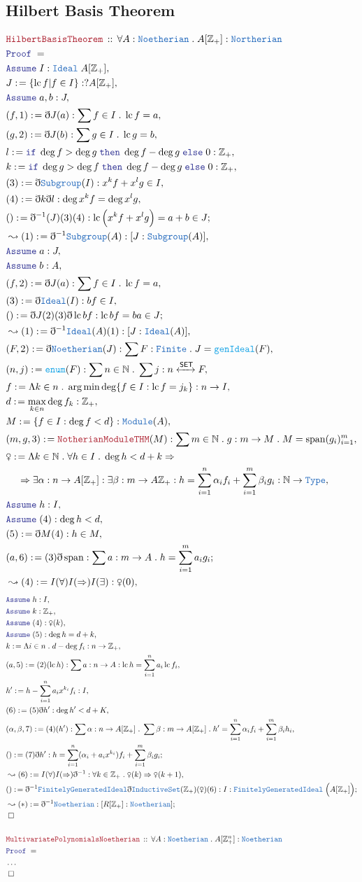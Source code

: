 \documentclass[12pt]{scrartcl}
\newcommand{\TYPE}[1]{\textcolor{NavyBlue}{\mathtt{#1}}}
\newcommand{\FUNC}[1]{\textcolor{Cerulean}{\mathtt{#1}}}
\newcommand{\LOGIC}[1]{\textcolor{Blue}{\mathtt{#1}}}
\newcommand{\THM}[1]{\textcolor{Maroon}{\mathtt{#1}}}
\renewcommand{\.}{\; . \;}
\newcommand{\de}{: \kern 0.1pc =}
\newcommand{\If}{\LOGIC{if} \;}
\newcommand{\Then}{ \; \LOGIC{then} \;}
\newcommand{\Else}{\; \LOGIC{else} \;}
\newcommand{\Theorem}[2]{& \THM{#1} \, :: \, #2 \\ & \Proof = \\ }
\newcommand{\NewLine}{\\ & \kern 1pc}
\newcommand{\Page}[1]{ \begin{align*} #1 \end{align*}   }
\newcommand{ \bd }{ \ByDef }
\newcommand{\NoProof}{ & \ldots \\ \EndProof}
\newcommand{\Type}{\TYPE{Type}}
\newcommand{\Int}{\mathbb{Z} }
\newcommand{\Nat}{\mathbb{N} }
\newcommand{\Say}[3]{& #1 \de #2 : #3, \\}
\newcommand{\Conclude}[3]{& #1 \de #2 : #3; \\}
\newcommand{\Derive}[3]{& \leadsto #1 \de #2 : #3, \\}
\newcommand{\DeriveConclude}[3]{& \leadsto #1 \de #2 : #3 ; \\}
\newcommand{\Assume}[2]{& \LOGIC{Assume} \; #1 : #2, \\}
\newcommand{\QED}{\; \square}
\newcommand{\EndProof}{& \QED \\}
\newcommand{\ByDef}{\eth}
\newcommand{\Proof}{\LOGIC{Proof} \; }
\newcommand{\ToIso}[1]{\xleftrightarrow{#1}}
\newcommand{\SET}{\mathsf{SET}}
\DeclareMathOperator{\Span}{span}
\newcommand{\Ideal}{\TYPE{Ideal}}
\newcommand{\FGI}{\TYPE{FinitelyGeneratedIdeal}}
\DeclareMathOperator{\lc}{lc}
\begin{document}
\subsection{Hilbert Basis Theorem}
\Page{
	\Theorem{HilbertBasisTheorem}{\forall A : \TYPE{Noetherian} \. A[\Int_+] : \TYPE{Northerian}}
	\Assume{I}{\Ideal\; A[\Int_+]}
	\Say{J}{ \{  \lc f | f \in I  \}  }{ ?A[\Int_+]}
	\Assume{a,b}{J}
	\Say{(f,1)}{\bd J(a)}{  \sum f \in I \. \lc f = a   }
	\Say{(g,2)}{\bd J(b)}{  \sum g \in I \. \lc g = b  }
	\Say{l}{ \If \deg f > \deg g \Then \deg f - \deg g  \Else 0}{\Int_+}
	\Say{k}{\If \deg g > \deg f \Then \deg f - \deg g \Else 0}{\Int_+}
	\Say{(3)}{\bd \TYPE{Subgroup}(I)}{x^k f + x^l g \in I  }
	\Say{(4)}{ \bd k \bd l  }{ \deg  x^k f = \deg x^l g   }
	\Conclude{()}{\bd^{-1}(J)(3)(4)}{  \lc\Big( x^k f + x^l g \Big) = a + b \in J    }
	\Derive{(1)}{\bd^{-1}\TYPE{Subgroup}(A)}{[J : \TYPE{Subgroup}(A)]}
	\Assume{a}{J}
	\Assume{b}{A}
	\Say{(f,2)}{\bd J(a)}{\sum f \in I \. \lc f = a}
	\Say{(3)}{\bd \TYPE{Ideal}(I)}{bf \in I}
	\Conclude{()}{ \bd J(2)(3)\bd \lc bf}{\lc bf = ba \in J}
	\Derive{(1)}{ \bd^{-1}\TYPE{Ideal}(A)(1)  }{[J : \TYPE{Ideal}(A)] }
	\Say{(F,2)}{\bd \TYPE{Noetherian}(J)}{\sum F : \TYPE{Finite} \. J = \FUNC{genIdeal}(F)}
	\Say{(n,j)}{\FUNC{enum}(F)}{ \sum n \in \Nat \. \sum j : n \ToIso{\SET} F }
	\Say{f}{ \Lambda k \in n \. \arg \min \deg \{  f \in I : \lc f = j_k \}  }{ n \to I  }
	\Say{d}{ \max_{k \in n} \deg f_k  }{ \Int_+ }
	\Say{M}{ \{ f \in I :  \deg f < d   \}  }{\TYPE{Module}(A)}
	\Say{(m,g,3)}{ \THM{NotherianModuleTHM}(M)  }{ \sum m \in \Nat \. g : m \to M \. M = \Span(g_i)^m_{i=1}  }
	\Say{\venus}{\Lambda k \in \Nat \. \forall h \in I \. \deg h < d + k \Rightarrow \NewLine \Rightarrow \exists \alpha : n \to A[\Int_+] : \exists \beta : m \to A{\Int_+} : h = \sum^n_{i=1} \alpha_i f_i + \sum^m_{i=1} \beta_i g_i   }
	{  \Nat \to \Type   }
	\Assume{h}{I}
	\Assume{(4)}{\deg h < d}
	\Say{(5)}{\bd M(4)}{ h \in M  }
	\Conclude{(a,6)}{(3)\bd \Span }{ \sum a : m \to A \. h = \sum^m_{i=1} a_ig_i }
	\Derive{(4)}{I(\forall)I(\Rightarrow)I(\exists)}{ \venus(0)}
}\Page{
	\Assume{h}{I}
	\Assume{k}{\Int_+}
	\Assume{(4)}{ \venus(k)  }
	\Assume{(5)}{\deg h = d + k}
	\Say{k}{\Lambda i \in n\. d - \deg f_i }{n \to \Int_+}
	\Say{(a,5)}{(2)(\lc h)}{\sum a : n \to A : \lc h = \sum^n_{i=1} a_i\lc f_i}
	\Say{h'}{ h - \sum^n_{i=1} a_i x^{k_i} f_i }{I}
	\Say{(6)}{(5)\bd h'}{\deg h' < d + K}
	\Say{(\alpha,\beta,7)}{(4)(h')}{ \sum \alpha : n \to A[\Int_+] \. \sum \beta : m \to A[\Int_+] \. h' = \sum_{i=1}^n \alpha_i f_i + \sum^m_{i=1} \beta_i h_i}
	\Conclude{()}{(7) \bd h'}{h = \sum^n_{i=1}(\alpha_i +  a_ix^{k_i})f_i + \sum^m_{i=1} \beta_i g_i }
	\Derive{(6)}{I(\forall)I(\Rightarrow)\bd^{-1}}{\forall k \in \Int_+ \. \venus(k) \Rightarrow \venus(k+1)}
	\Conclude{()}{\bd^{-1}\FGI \bd \TYPE{InductiveSet}(\Int_+)(\venus)(6)}{ I : \FGI\; \Big(A[\Int_+]\Big)}
	\DeriveConclude{(*)}{\bd^{-1} \TYPE{Noetherian}}{ [R[\Int_+] : \TYPE{Noetherian}] }
	\EndProof
	\\
	\Theorem{MultivariatePolynomialsNoetherian}{\forall A : \TYPE{Noetherian} \. A[\Int_+^n] : \TYPE{Noetherian}}
	\NoProof
}
\newpage
\end{document}
